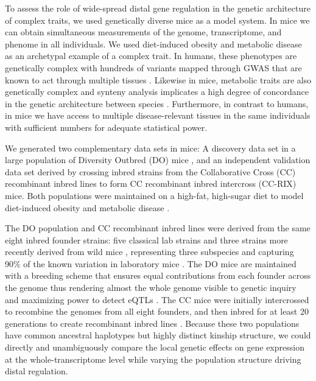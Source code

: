 \documentclass[
]{article}
\begin{document}
To assess the role of wide-spread distal gene regulation in the genetic
architecture of complex traits, we used genetically diverse mice as a
model system. In mice we can obtain simultaneous measurements of the
genome, transcriptome, and phenome in all individuals. We used
diet-induced obesity and metabolic disease as an archetypal example of a
complex trait. In humans, these phenotypes are genetically complex with
hundreds of variants mapped through GWAS \cite{pmid36350656, 
pmid34556834} that are known to act through multiple tissues
\cite{pmid28089486, pmid10889786}. Likewise in mice, metabolic traits
are also genetically complex \cite{pmid31343992} and synteny analysis
implicates a high degree of concordance in the genetic architecture
between species \cite{pmid31343992, pmid29567659}. Furthermore, in
contrast to humans, in mice we have access to multiple disease-relevant
tissues in the same individuals with sufficient numbers for adequate
statistical power.

We generated two complementary data sets in mice: A discovery data set
in a large population of Diversity Outbred (DO) mice
\cite{pmid22892839}, and an independent validation data set derived by
crossing inbred strains from the Collaborative Cross (CC) recombinant
inbred lines \cite{pmid18716833} to form CC recombinant inbred
intercross (CC-RIX) mice. Both populations were maintained on a
high-fat, high-sugar diet to model diet-induced obesity and metabolic
disease \cite{pmid29567659}.

The DO population and CC recombinant inbred lines were derived from the
same eight inbred founder strains: five classical lab strains and three
strains more recently derived from wild mice \cite{pmid22892839},
representing three subspecies and capturing 90\% of the known variation
in laboratory mice \cite{pmid31133439}. The DO mice are maintained with
a breeding scheme that ensures equal contributions from each founder
across the genome thus rendering almost the whole genome visible to
genetic inquiry and maximizing power to detect eQTLs
\cite{pmid22892839}. The CC mice were initially intercrossed to
recombine the genomes from all eight founders, and then inbred for at
least 20 generations to create recombinant inbred lines
\cite{pmid18716833, pmid21411855, 
pmid31133439}. Because these two populations have common ancestral
haplotypes but highly distinct kinship structure, we could directly and
unambiguously compare the local genetic effects on gene expression at
the whole-transcriptome level while varying the population structure
driving distal regulation.
\end{document}
